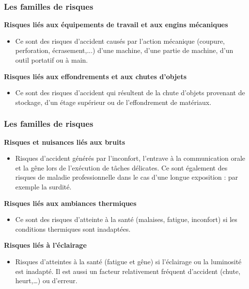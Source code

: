 \documentclass{beamer}
\begin{document}
\begin{frame}
\frametitle{Les familles de risques}

\textbf{Risques liés aux équipements de travail et aux engins mécaniques}
\begin{itemize}
\item Ce sont des risques d’accident causés par l’action mécanique (coupure, perforation, écrasement,...) d’une machine, d’une partie de machine, d’un outil portatif ou à main.
\end{itemize}
\textbf{Risques liés aux effondrements et aux chutes d’objets}
\begin{itemize}
\item Ce sont des risques d’accident qui résultent de la chute d’objets provenant de stockage, d’un étage supérieur ou de l’effondrement de matériaux.
\end{itemize}
\end{frame}


\begin{frame}
\frametitle{Les familles de risques}

\textbf{Risques et nuisances liés aux bruits}
\begin{itemize}
\item  Risques d’accident générés par l’inconfort, l’entrave à la communication orale et la gêne lors de l’exécution de tâches délicates. Ce sont également des risques de maladie professionnelle dans le cas d’une longue exposition : par exemple la surdité.
\end{itemize}
\textbf{Risques liés aux ambiances thermiques}
\begin{itemize}
\item  Ce sont des risques d’atteinte à la santé (malaises, fatigue, inconfort) si les conditions thermiques sont inadaptées.
\end{itemize}
\textbf{Risques liés à l’éclairage}
\begin{itemize}
\item  Risques d’atteintes à la santé (fatigue et gêne) si l’éclairage ou la  luminosité est inadapté. Il est aussi un facteur relativement fréquent d’accident (chute, heurt,…) ou d’erreur.
\end{itemize}
\end{frame}
\end{document}
